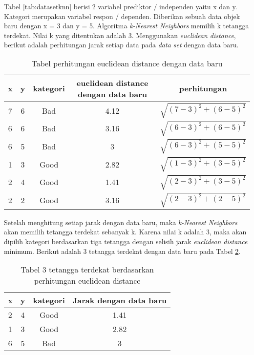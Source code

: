  Tabel \ref{tab:datasetknn} berisi 2 variabel prediktor / independen yaitu x dan y. Kategori merupakan variabel respon / dependen. Diberikan sebuah data objek baru dengan x = 3 dan y = 5. Algoritma \textit{k-Nearest Neighbors}  memilih k tetangga terdekat.  Nilai k yang ditentukan adalah 3. Menggunakan \textit{euclidean distance}, berikut adalah perhitungan jarak setiap data pada \textit{data set}  dengan data baru. 
 
 \begin{table}[H]
  \caption{Tabel perhitungan euclidean distance dengan data baru}
 \centering
\begin{tabular}{|c|c|c|c|c|}
 \hline 
 x & y & kategori & euclidean distance dengan data baru & perhitungan \\ 
 \hline 
 7 & 6 & Bad & 4.12 & $\sqrt{(7-3)^2+(6-5)^2}$ \\ 
 \hline 
 6 & 6 & Bad & 3.16 & $\sqrt{(6-3)^2+(6-5)^2}$ \\ 
 \hline 
 6 & 5 & Bad & 3 & $\sqrt{(6-3)^2+(5-5)^2}$ \\ 
 \hline 
 1 & 3 & Good & 2.82 & $\sqrt{(1-3)^2+(3-5)^2}$ \\ 
 \hline 
 2 & 4 & Good & 1.41 & $\sqrt{(2-3)^2+(3-5)^2}$ \\ 
 \hline 
 2 & 2 & Good & 3.16 & $\sqrt{(2-3)^2+(2-5)^2}$ \\ 
 \hline 
 \end{tabular}  
 \label{tab:hitunganeuclideandistanceknn}
  \end{table}
  
Setelah menghitung setiap jarak dengan data baru, maka \textit{k-Nearest Neighbors} akan memilih tetangga terdekat sebanyak k. Karena nilai k adalah 3, maka akan dipilih kategori berdasarkan tiga tetangga dengan selisih jarak \textit{euclidean distance} minimum. Berikut adalah 3 tetangga terdekat dengan data baru pada Tabel \ref{tab:tabel3tetangga}.

\begin{table}[H]
\caption{Tabel 3 tetangga terdekat berdasarkan perhitungan euclidean distance}
\centering
\begin{tabular}{|c|c|c|c|}
\hline 
x & y & kategori & Jarak dengan data baru \\ 
\hline 
2 & 4 & Good & 1.41 \\ 
\hline 
1 & 3 & Good & 2.82 \\ 
\hline 
6 & 5 & Bad & 3 \\ 
\hline 
\end{tabular} 
\label{tab:tabel3tetangga}
 \end{table}


